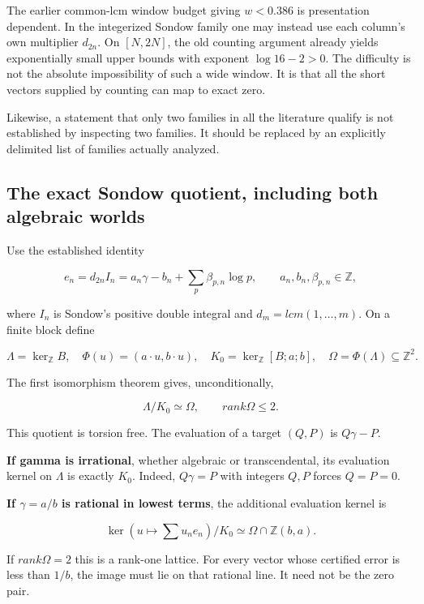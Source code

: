 \documentclass[11pt,a4paper]{article}
\theoremstyle{definition}
\theoremstyle{remark}
\theoremstyle{plain}
\numberwithin{equation}{section}
\def\operatorname#1{#1}\def\mathrm#1{#1}}
\begin{document}
The earlier common-lcm window budget giving \(w<0.386\) is presentation
dependent. In the integerized Sondow family one may instead use each
column's own multiplier \(d_{2n}\). On $[N,2N]$, the old counting
argument already yields exponentially small upper bounds with exponent
\(\log16-2>0\). The difficulty is not the absolute impossibility of such
a wide window. It is that all the short vectors supplied by counting can
map to exact zero.

Likewise, a statement that only two families in all the literature
qualify is not established by inspecting two families. It should be
replaced by an explicitly delimited list of families actually analyzed.

\subsection{The exact Sondow quotient, including both algebraic
worlds}\label{sc:au:the-exact-sondow-quotient-including-both-algebraic-worlds}

Use the established identity

\[
e_n=d_{2n}I_n=a_n\gamma-b_n+\sum_p\beta_{p,n}\log p,
\qquad a_n,b_n,\beta_{p,n}\in\mathbb Z,
\]

where $I_n$ is Sondow's positive double integral and
$d_m=\operatorname{lcm}(1,\ldots,m)$. On a finite block define

\[
\Lambda=\ker_{\mathbb Z}B,\quad
\Phi(u)=(a\cdot u,b\cdot u),\quad
K_0=\ker_{\mathbb Z}[B;a;b],\quad
\Omega=\Phi(\Lambda)\subseteq\mathbb Z^2.
\]

The first isomorphism theorem gives, unconditionally,

\[
\Lambda/K_0\simeq\Omega,\qquad
\operatorname{rank}\Omega\le2.
\]

This quotient is torsion free. The evaluation of a target $(Q,P)$ is $Q\gamma-P$.

\textbf{If gamma is irrational}, whether algebraic or transcendental,
its evaluation kernel on $\Lambda$ is exactly $K_0$. Indeed, $Q\gamma=P$
with integers $Q,P$ forces $Q=P=0$.

\textbf{If $\gamma=a/b$ is rational in lowest terms}, the additional
evaluation kernel is

\[
\ker(u\mapsto\textstyle\sum u_ne_n)/K_0
\simeq\Omega\cap\mathbb Z(b,a).
\]

If $\operatorname{rank}\Omega=2$ this is a rank-one lattice. For every vector whose
certified error is less than $1/b$, the image must lie on that rational
line. It need not be the zero pair.
\end{document}
